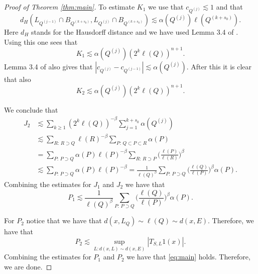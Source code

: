 \documentclass[11pt,a4paper,leqno]{amsart}
\numberwithin{equation}{section}
\theoremstyle{plain}
\theoremstyle{definition}
\theoremstyle{remark}
\begin{document}
\begin{proof}[Proof of Theorem \ref{thm:main}]
To estimate $K_1$ we use that $c_{Q^{(j)}} \lesssim 1$ and that
\begin{displaymath}
d_{H}(L_{Q^{(j-1)}} \cap B_{Q^{(k+s_0)}} , L_{Q^{(j)}}\cap B_{Q^{(k+s_0)}}) \lesssim \alpha(Q^{(j)}) \ell(Q^{(k+s_0)}).
\end{displaymath}
Here $d_H$ stands for the Hausdorff distance and we have used Lemma 3.4 of \cite{T1}. Using this one sees that
\begin{displaymath}
K_1 \lesssim \alpha(Q^{(j)}) (2^k\ell(Q))^{n+1}.
\end{displaymath}
Lemma 3.4 of \cite{T1} also gives that $|c_{Q^{(j)}} -c_{Q^{(j-1)}}| \lesssim \alpha(Q^{(j)})$. After this it is clear that also
\begin{displaymath}
K_2 \lesssim \alpha(Q^{(j)}) (2^k\ell(Q))^{n+1}.
\end{displaymath}

We conclude that
\begin{align*}
J_2 &\lesssim \sum_{k \ge 1} (2^k\ell(Q))^{-\beta} \sum_{j=1}^{k + s_0} \alpha(Q^{(j)}) \\
&\lesssim \sum_{R:\, R \supset Q} \ell(R)^{-\beta} \sum_{P:\, Q \subset P \subset R} \alpha(P) \\
&= \sum_{P:\, P \supset Q}\alpha(P) \ell(P)^{-\beta} \sum_{R:\, R \supset P} \Big(\frac{\ell(P)}{\ell(R)}\Big)^{\beta} \\ &\lesssim \sum_{P:\, P \supset Q}\alpha(P) \ell(P)^{-\beta} = 
 \frac{1}{\ell(Q)^{\beta}} \sum_{P:\,P \supset Q} \Big( \frac{\ell(Q)}{\ell(P)} \Big)^{\beta} \alpha(P).
\end{align*}
Combining the estimates for $J_1$ and $J_2$ we have that
\begin{displaymath}
P_1 \lesssim \frac{1}{\ell(Q)^{\beta}} \sum_{P:\,P \supset Q} \Big( \frac{\ell(Q)}{\ell(P)} \Big)^{\beta} \alpha(P).
\end{displaymath}

For $P_2$ notice that we have that $d(x, L_Q) \sim \ell(Q) \sim d(x,E)$. Therefore, we have that
\begin{displaymath}
P_2 \lesssim \sup_{L\colon d(x,L) \sim d(x,E)} |T_{S,L}1(x)|.
\end{displaymath}
Combining the estimates for $P_1$ and $P_2$ we have that \eqref{eq:main} holds. Therefore, we are done.

\end{proof}
\end{document}
